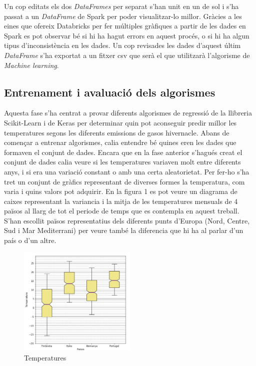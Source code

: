 \documentclass[10pt,a4paper,twocolumn,twoside]{article}
\begin{document}
Un cop editats els dos \textit{DataFrames} per separat s'han unit en un de sol i s'ha passat a un \textit{DataFrame} de Spark per poder visualitzar-lo millor. Gràcies a les eines que ofereix Databricks per fer múltiples gràfiques a partir de les dades en Spark es pot observar bé si hi ha hagut errors en aquest procés, o si hi ha algun tipus d'inconsistència en les dades. Un cop revisades les dades d'aquest últim \textit{DataFrame} s'ha exportat a un fitxer csv que serà el que utilitzarà l'algorisme de \textit{Machine learning}.
\subsection{Entrenament i avaluació dels algorismes}
Aquesta fase s'ha centrat a provar diferents algorismes de regressió de la llibreria Scikit-Learn i de Keras per determinar quin pot aconseguir predir millor les temperatures segons les diferents emissions de gasos hivernacle. Abans de començar a entrenar algorismes, calia entendre bé quines eren les dades que formaven el conjunt de dades. Encara que en la fase anterior s'hagués creat el conjunt de dades calia veure si les temperatures variaven molt entre diferents anys, i si era una variació constant o amb una certa aleatorietat. Per fer-ho s'ha tret un conjunt de gràfics representant de diverses formes la temperatura, com varia i quins valors pot adquirir. En la figura 1 es pot veure un diagrama de caixes representant la variancia i la mitja de les temperatures mensuals de 4 països al llarg de tot el periode de temps que es contempla en aquest treball. S'han escollit països representatius dels diferents punts d'Europa (Nord, Centre, Sud i Mar Mediterrani) per veure també la diferencia que hi ha al parlar d'un país o d'un altre.
\begin{figure}[!h]
\centering
	\includegraphics[width=0.5\textwidth]{../img/tempMitjaVariacioPaisos}
	\caption{Temperatures }
	\label{fig-tempMitjaPaisos}
\end{figure}
\end{document}
